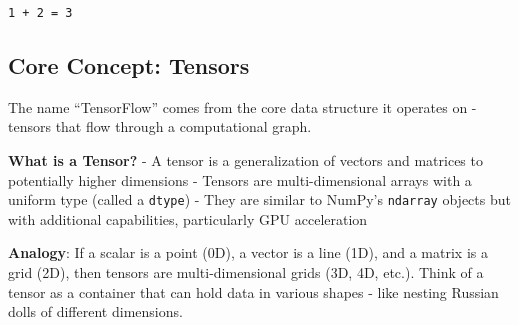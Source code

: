 \documentclass[
  letterpaper,
  DIV=11,
  numbers=noendperiod]{scrreprt}
\begin{document}
\begin{verbatim}
1 + 2 = 3
\end{verbatim}

\subsection{Core Concept: Tensors}\label{core-concept-tensors}

The name ``TensorFlow'' comes from the core data structure it operates
on - tensors that flow through a computational graph.

\textbf{What is a Tensor?} - A tensor is a generalization of vectors and
matrices to potentially higher dimensions - Tensors are
multi-dimensional arrays with a uniform type (called a \texttt{dtype}) -
They are similar to NumPy's \texttt{ndarray} objects but with additional
capabilities, particularly GPU acceleration

\textbf{Analogy}: If a scalar is a point (0D), a vector is a line (1D),
and a matrix is a grid (2D), then tensors are multi-dimensional grids
(3D, 4D, etc.). Think of a tensor as a container that can hold data in
various shapes - like nesting Russian dolls of different dimensions.
\end{document}
